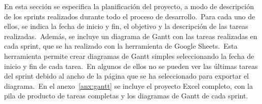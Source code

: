 
En esta sección se especifica la planificación del proyecto, a modo de descripción de los sprints realizados durante
todo el proceso de desarrollo.\ Para cada uno de
ellos, se indica la fecha de inicio y fin, el objetivo y la descripción de las tareas realizadas.\ Además, se incluye
un diagrama de Gantt con las tareas realizadas en cada sprint, que se ha realizado con la herramienta
 de Google Sheets.\ Esta herramienta permite crear diagramas de Gantt simples
seleccionando la fecha de inicio y fin de cada tarea.\ En algunos de ellos no se pueden ver las últimas tareas del
sprint debido al ancho de la página que se ha seleccionado para exportar el diagrama.\ En el anexo~\ref{anx:gantt}
se incluye el proyecto Excel completo, con la pila de producto de tareas completas y los diagramas de Gantt de cada
sprint.












